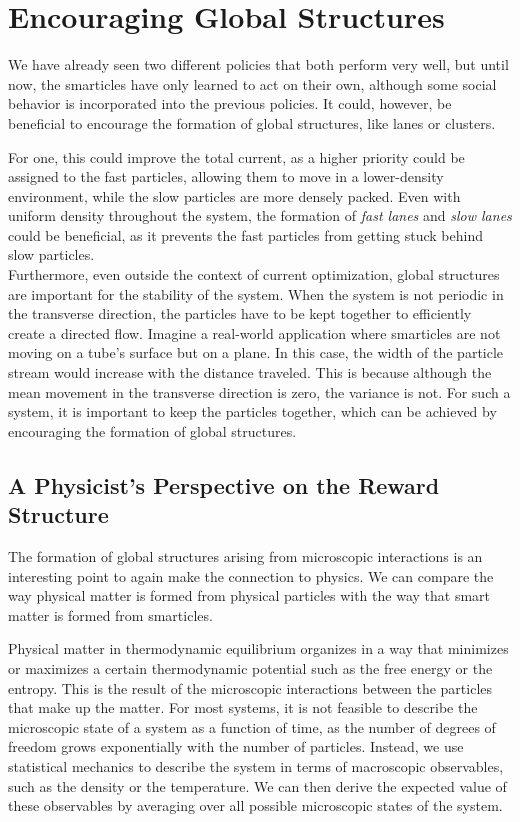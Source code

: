 \section{Encouraging Global Structures}
\label{sec:global_structures}
We have already seen two different policies that both perform very well, but until now, the smarticles have only learned to act on their own, although some social behavior is incorporated into the previous policies. It could, however, be beneficial to encourage the formation of global structures, like lanes or clusters. 


For one, this could improve the total current, as a higher priority could be assigned to the fast particles, allowing them to move in a lower-density environment, while the slow particles are more densely packed. Even with uniform density throughout the system, the formation of \textit{fast lanes} and \textit{slow lanes} could be beneficial, as it prevents the fast particles from getting stuck behind slow particles.
\\
Furthermore, even outside the context of current optimization, global structures are important for the stability of the system. When the system is not periodic in the transverse direction, the particles have to be kept together to efficiently create a directed flow. Imagine a real-world application where smarticles are not moving on a tube's surface but on a plane. In this case, the width of the particle stream would increase with the distance traveled. This is because although the mean movement in the transverse direction is zero, the variance is not. For such a system, it is important to keep the particles together, which can be achieved by encouraging the formation of global structures.

\subsection{A Physicist's Perspective on the Reward Structure}
\label{sec:physics_reward_structure}
The formation of global structures arising from microscopic interactions is an interesting point to again make the connection to physics. We can compare the way physical matter is formed from physical particles with the way that smart matter is formed from smarticles. 


Physical matter in thermodynamic equilibrium organizes in a way that minimizes or maximizes a certain thermodynamic potential such as the free energy or the entropy. This is the result of the microscopic interactions between the particles that make up the matter. For most systems, it is not feasible to describe the microscopic state of a system as a function of time, as the number of degrees of freedom grows exponentially with the number of particles. Instead, we use statistical mechanics to describe the system in terms of macroscopic observables, such as the density or the temperature. We can then derive the expected value of these observables by averaging over all possible microscopic states of the system.


